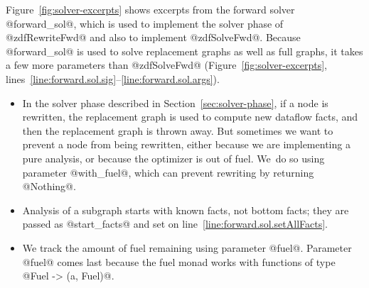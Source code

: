 \documentclass[blockstyle,preprint,natbib,nocopyrightspace]{sigplanconf}
\newcommand\lineref[1]{line~\ref{line:#1}}
\newcommand\linerangeref[2]{\mbox{lines~\ref{line:#1}--\ref{line:#2}}}
\newcommand\secref[1]{Section~\ref{sec:#1}}
\newcommand\figref[1]{Figure~\ref{fig:#1}}
\begin{document}
\figref{solver-excerpts} shows excerpts from the forward solver 
@forward_sol@, which is used to implement the solver phase of
@zdfRewriteFwd@ and also to implement
@zdfSolveFwd@.
Because @forward_sol@ is used to solve replacement graphs as well as
full graphs, it
takes a few more parameters than @zdfSolveFwd@
(\figref{solver-excerpts}, \linerangeref{forward.sol.sig}{forward.sol.args}).
\begin{itemize}
\item
In the solver phase described in \secref{solver-phase},
if a node is rewritten, the replacement graph is used to compute new
dataflow facts, and then the replacement graph is thrown away.
But sometimes we want to prevent a node from being rewritten,
either because
we are implementing a pure analysis, or because the optimizer
is out of fuel. 
We~do so using parameter @with_fuel@, which can prevent rewriting by
returning @Nothing@.
\item
Analysis of a subgraph starts with known facts, not
bottom facts; they are passed as %
@start_facts@
and
 set on \lineref{forward.sol.setAllFacts}.
\item
We track the amount of fuel remaining using
parameter @fuel@.
Parameter @fuel@ comes last because the fuel monad works with
functions of type @Fuel -> (a, Fuel)@.
\end{itemize}
%
\iffalse
Function @solve@, on \linerangeref{solve.1}{solve.*} of
\figref{solver-excerpts}, 
takes an input fact, a graph, and a fuel supply; it~returns a pair
containing the exit fact and the 
remaining fuel supply.
It~also has a side effect on the state stored in the inner dataflow monad:
it brings the facts associated with labels up to a fixed point.
\fi
\end{document}
